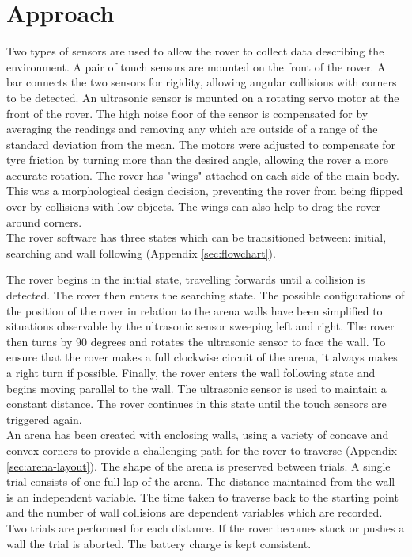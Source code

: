 \documentclass[a4paper,12pt,twocolumn]{article}
\begin{document}
\section{Approach}
Two types of sensors are used to allow the rover to collect data describing the environment. A pair of touch sensors are mounted on the front of the rover. A bar connects the two sensors for rigidity, allowing angular collisions with corners to be detected. An ultrasonic sensor is mounted on a rotating servo motor at the front of the rover. The high noise floor of the sensor is compensated for by averaging the readings and removing any which are outside of a range of the standard deviation from the mean. The motors were adjusted to compensate for tyre friction by turning more than the desired angle, allowing the rover a more accurate rotation. The rover has "wings" attached on each side of the main body. This was a morphological design decision, preventing the rover from being flipped over by collisions with low objects. The wings can also help to drag the rover around corners.\\

The rover software has three states which can be transitioned between: initial, searching and wall following (Appendix \ref{sec:flowchart}).

The rover begins in the initial state, travelling forwards until a collision is detected. The rover then enters the searching state. The possible configurations of the position of the rover in relation to the arena walls have been simplified to situations observable by the ultrasonic sensor sweeping left and right.
The rover then turns by 90 degrees and rotates the ultrasonic sensor to face the wall. 
To ensure that the rover makes a full clockwise circuit of the arena, it always makes a right turn if possible.
Finally, the rover enters the wall following state and begins moving parallel to the wall. The ultrasonic sensor is used to maintain a constant distance. The rover continues in this state until the touch sensors are triggered again.\\

An arena has been created with enclosing walls, using a variety of concave and convex corners to provide a challenging path for the rover to traverse (Appendix \ref{sec:arena-layout}). The shape of the arena is preserved between trials. A single trial consists of one full lap of the arena. The distance maintained from the wall is an independent variable. The time taken to traverse back to the starting point and the number of wall collisions are dependent variables which are recorded. Two trials are performed for each distance. If the rover becomes stuck or pushes a wall the trial is aborted. The battery charge is kept consistent.
\end{document}
